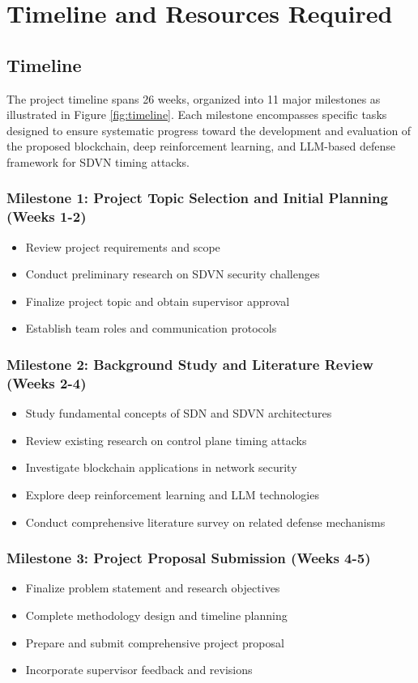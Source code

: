 \section{Timeline and Resources Required}

\subsection{Timeline}

The project timeline spans 26 weeks, organized into 11 major milestones as illustrated in Figure \ref{fig:timeline}. Each milestone encompasses specific tasks designed to ensure systematic progress toward the development and evaluation of the proposed blockchain, deep reinforcement learning, and LLM-based defense framework for SDVN timing attacks.

\subsubsection*{Milestone 1: Project Topic Selection and Initial Planning (Weeks 1-2)}
\begin{itemize}
    \item Review project requirements and scope
    \item Conduct preliminary research on SDVN security challenges
    \item Finalize project topic and obtain supervisor approval
    \item Establish team roles and communication protocols
\end{itemize}

\subsubsection*{Milestone 2: Background Study and Literature Review (Weeks 2-4)}
\begin{itemize}
    \item Study fundamental concepts of SDN and SDVN architectures
    \item Review existing research on control plane timing attacks
    \item Investigate blockchain applications in network security
    \item Explore deep reinforcement learning and LLM technologies
    \item Conduct comprehensive literature survey on related defense mechanisms
\end{itemize}

\subsubsection*{Milestone 3: Project Proposal Submission (Weeks 4-5)}
\begin{itemize}
    \item Finalize problem statement and research objectives
    \item Complete methodology design and timeline planning
    \item Prepare and submit comprehensive project proposal
    \item Incorporate supervisor feedback and revisions
\end{itemize}

